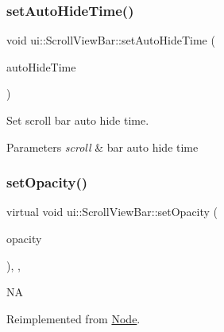 \subsubsection{\texorpdfstring{set\+Auto\+Hide\+Time()}{setAutoHideTime()}\hspace{0.1cm}{\footnotesize\ttfamily [2/2]}}
{\footnotesize\ttfamily void ui\+::\+Scroll\+View\+Bar\+::set\+Auto\+Hide\+Time (\begin{DoxyParamCaption}\item[{float}]{auto\+Hide\+Time }\end{DoxyParamCaption})\hspace{0.3cm}{\ttfamily [inline]}}



Set scroll bar auto hide time. 


\begin{DoxyParams}{Parameters}
{\em scroll} & bar auto hide time \\
\hline
\end{DoxyParams}
\mbox{\label{classui_1_1ScrollViewBar_a89da6d683d0157d90c93b559e90c69e3}} 
\subsubsection{\texorpdfstring{set\+Opacity()}{setOpacity()}\hspace{0.1cm}{\footnotesize\ttfamily [1/2]}}
{\footnotesize\ttfamily virtual void ui\+::\+Scroll\+View\+Bar\+::set\+Opacity (\begin{DoxyParamCaption}\item[{G\+Lubyte}]{opacity }\end{DoxyParamCaption})\hspace{0.3cm}{\ttfamily [inline]}, {\ttfamily [override]}, {\ttfamily [virtual]}}

NA 

Reimplemented from \hyperlink{classNode_ae41a9db63bfa3d466ee7c9d79c35352d}{Node}.

\mbox{\label{classui_1_1ScrollViewBar_a89da6d683d0157d90c93b559e90c69e3}} 
